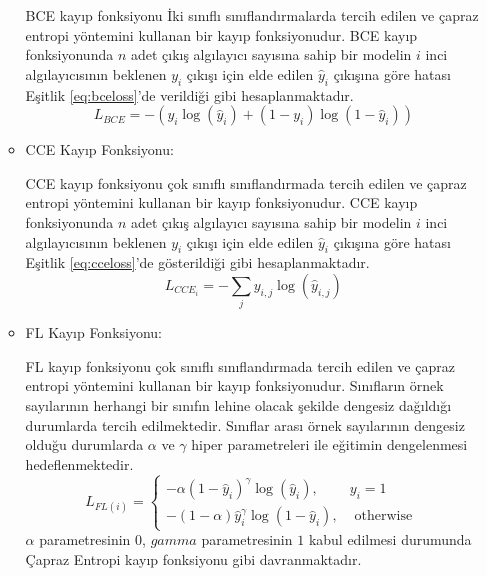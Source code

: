 \begin{itemize}
\begin{itemize}
    	BCE kayıp fonksiyonu İki sınıflı sınıflandırmalarda tercih edilen ve çapraz entropi yöntemini kullanan bir kayıp fonksiyonudur. BCE kayıp fonksiyonunda $n$ adet çıkış algılayıcı sayısına sahip bir modelin $i$ inci algılayıcısının beklenen $y_{i}$ çıkışı için elde edilen $\hat{y}_{i}$ çıkışına göre hatası Eşitlik \ref{eq:bceloss}'de verildiği gibi hesaplanmaktadır.
    	{\setlength{\mathindent}{-1cm}
    	\begin{equation}
    		\label{eq:bceloss}
    		L_{BCE}=-\left(y_{i} \log \left(\hat{y}_{i}\right)+\left(1-y_{i}\right) \log \left(1-\hat{y}_{i}\right)\right)
    	\end{equation}}
    	\item CCE Kayıp Fonksiyonu: 
    	
    	CCE kayıp fonksiyonu çok sınıflı sınıflandırmada tercih edilen ve çapraz entropi yöntemini kullanan bir kayıp fonksiyonudur. CCE kayıp fonksiyonunda $n$ adet çıkış algılayıcı sayısına sahip bir modelin $i$ inci algılayıcısının beklenen $y_{i}$ çıkışı için elde edilen $\hat{y}_{i}$ çıkışına göre hatası Eşitlik \ref{eq:cceloss}'de gösterildiği gibi hesaplanmaktadır.
    	{\setlength{\mathindent}{-1cm}
    	\begin{equation}
    		\label{eq:cceloss}
    		L_{CCE_{i}}=-\sum_{j} y_{i, j} \log \left(\hat{y}_{i, j}\right)
    	\end{equation}}
    	\item FL Kayıp Fonksiyonu: 
    	
    	FL kayıp fonksiyonu çok sınıflı sınıflandırmada tercih edilen ve çapraz entropi yöntemini kullanan bir kayıp fonksiyonudur. Sınıfların örnek sayılarının herhangi bir sınıfın lehine olacak şekilde dengesiz dağıldığı durumlarda tercih edilmektedir. Sınıflar arası örnek sayılarının dengesiz olduğu durumlarda $\alpha$ ve $\gamma$ hiper parametreleri ile eğitimin dengelenmesi hedeflenmektedir.	
    	{\setlength{\mathindent}{-1cm}
    	\begin{equation}
    		\label{eq:flloss}
    		L_{FL(i)}=\left\{\begin{array}{cc}
                        -\alpha(1-\hat{y}_{i})^{\gamma} \log (\hat{y}_{i}), & y_{i}=1 \\
                        -(1-\alpha) \hat{y}_{i}^{\gamma} \log (1-\hat{y}_{i}), & \text { otherwise }
                        \end{array}\right.
    	\end{equation}}
    	$\alpha$ parametresinin $0$, $gamma$ parametresinin $1$ kabul edilmesi durumunda Çapraz Entropi kayıp fonksiyonu gibi davranmaktadır.
    \end{itemize}
\end{itemize}

